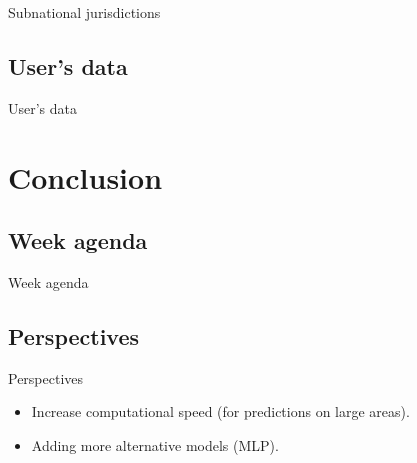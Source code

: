 \documentclass[10pt,table,dvipsnames,compress]{beamer}
\begin{document}
\begin{frame}[label={sec:orgd839180}]{Subnational jurisdictions}
\end{frame}

\subsection{User's data}
\label{sec:org2337ee1}

\begin{frame}[label={sec:org00152ad}]{User's data}
\end{frame}

\section{Conclusion}
\label{sec:orga9b4560}

\subsection{Week agenda}
\label{sec:org822e37d}

\begin{frame}[label={sec:org4be7945}]{Week agenda}
\end{frame}

\subsection{Perspectives}
\label{sec:org9e9a308}

\begin{frame}[label={sec:org967046d}]{Perspectives}
\begin{itemize}
\item Increase computational speed (for predictions on large areas).
\item Adding more alternative models (MLP).
\end{itemize}
\end{frame}

\end{document}
